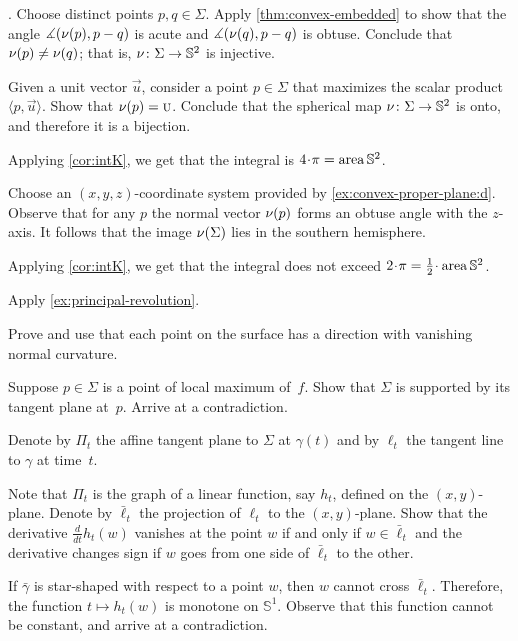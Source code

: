 \begin{multicols}{2}
\parbf{\ref{ex:intK}}.
Choose distinct points $p,q\in\Sigma$.
Apply \ref{thm:convex-embedded} to show that the angle 
$\measuredangle(\nu(p),p-q)$ is acute and $\measuredangle(\nu(q),p-q)$ is obtuse.
Conclude that $\nu(p)\ne\nu(q)$;
that is, $\nu\colon\Sigma\to\mathbb{S}^2$ is injective.

Given a unit vector $\vec u$, consider a point $p\in \Sigma$ that maximizes the scalar product $\langle p,\vec u\rangle$.
Show that $\nu(p)=\text{\sc{u}}$.
Conclude that the spherical map $\nu\colon\Sigma\to\mathbb{S}^2$ is onto, and therefore it is a bijection.

Applying \ref{cor:intK}, we get that the integral is $4\cdot\pi=\area\mathbb{S}^2$.

 Choose an $(x,y,z)$-coordinate system provided by \ref{ex:convex-proper-plane:d}.
Observe that for any $p$ the normal vector $\nu(p)$ forms an obtuse angle with the $z$-axis.
It follows that the image $\nu(\Sigma)$ lies in the southern hemisphere.

Applying \ref{cor:intK}, we get that the integral does not exceed $2\cdot\pi=\tfrac12\cdot\area\mathbb{S}^2$.

Apply \ref{ex:principal-revolution}.

Prove and use that each point on the surface has a direction with vanishing normal curvature.

 Suppose $p\in \Sigma$ is a point of local maximum of~$f$.
Show that $\Sigma$ is supported by its tangent plane at~$p$.
Arrive at a contradiction.


Denote by $\Pi_t$ the affine tangent plane to $\Sigma$ at $\gamma(t)$ and by $\ell_t$ the tangent line to $\gamma$ at time~$t$.

Note that $\Pi_t$ is the graph of a linear function, say $h_t$, defined on the $(x, y)$-plane.
Denote by $\bar\ell_t$ the projection of $\ell_t$ to the $(x, y)$-plane.
Show that the derivative $\tfrac{d}{dt}h_t(w)$ vanishes at the point $w$ if and only if $w\in \bar\ell_t$ 
and the derivative changes sign if $w$ goes from one side of $\bar\ell_t$ to the other.

If $\bar\gamma$ is star-shaped with respect to a point $w$, then $w$ cannot cross $\bar\ell_t$.
Therefore, the function $t\mapsto h_t(w)$ is monotone on $\mathbb{S}^1$.
Observe that this function cannot be constant, and arrive at a contradiction.


\end{multicols}
